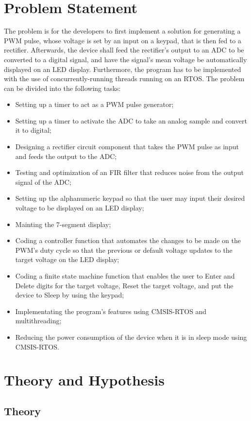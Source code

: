 \documentclass[12pt]{report}
\begin{document}
\section{Problem Statement}
The problem is for the developers to first implement a solution for generating a PWM pulse, whose voltage is set by an input on a keypad, that is then fed to a rectifier. Afterwards, the device shall feed the rectifier's output to an ADC to be converted to a digital signal, and have the signal's mean voltage be automatically displayed on an LED display. Furthermore, the program has to be implemented with the use of concurrently-running threads running on an RTOS. The problem can be divided into the following tasks:
\begin{itemize}
	\item Setting up a timer to act as a PWM pulse generator;
	\item Setting up a timer to activate the ADC to take an analog sample and convert it to digital;
	\item Designing a rectifier circuit component that takes the PWM pulse as input and feeds the output to the ADC;
	\item Testing and optimization of an FIR filter that reduces noise from the output signal of the ADC;
	\item Setting up the alphanumeric keypad so that the user may input their desired voltage to be displayed on an LED display;
	\item Mainting the 7-segment display;
	\item Coding a controller function that automates the changes to be made on the PWM's duty cycle so that the previous or default voltage updates to the target voltage on the LED display;
	\item Coding a finite state machine function that enables the user to Enter and Delete digits for the target voltage, Reset the target voltage, and put the device to Sleep by using the keypad;
	\item Implementating the program's features using CMSIS-RTOS and multithreading;
	\item Reducing the power consumption of the device when it is in sleep mode using CMSIS-RTOS.
\end{itemize}
\section{Theory and Hypothesis}
\subsection{Theory}
\end{document}
